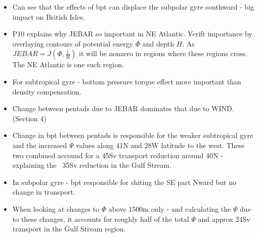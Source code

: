 \documentclass[..\Papers.tex]{subfiles}
\begin{document}
\begin{itemize}
    \item Can see that the effects of bpt can displace the subpolar gyre southward - big impact on British Isles.
    \item P10 explains why JEBAR so important in NE Atlantic. Verift importance by overlaying contours of potential energy $\Phi$ and depth $H$. As $JEBAR=J(\Phi,\frac{1}{H})$ it will be nonzero in regions where these regions cross. The NE Atlantic is one such region. 
    \item For subtropical gyre - bottom pressure torque effect more important than density compensation.
    \item Change between pentads due to JEBAR dominates that due to WIND. (Section 4)
    \item Change in bpt between pentads is responsible for the weaker subtropical gyre and the increased $\Psi$ values along 41\degree N and 28\degree W latitude to the west. These two combined accound for a 45Sv transport reduction around 40\degree N - explaining the ~35Sv reduction in the Gulf Stream.
    \item In subpolar gyre - bpt responsible for shiting the SE part Nward but no change in transport.
    \item When looking at changes to $\Phi$ above 1500m only - and calculating the $\Psi$ due to these changes, it accounts for roughly half of the total $\Psi$ and approx 24Sv transport in the Gulf Stream region.


\end{itemize}
\end{document}
